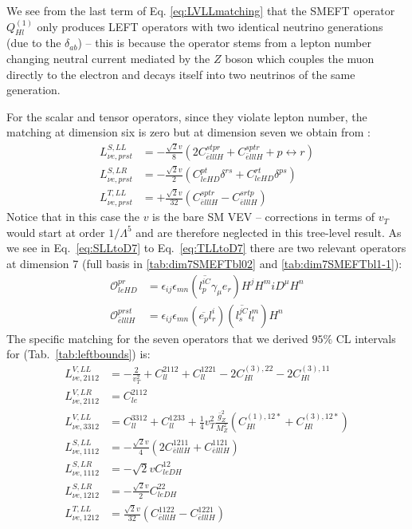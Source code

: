 We see from the last term of Eq. \ref{eq:LVLLmatching} that the SMEFT operator $Q_{Hl}^{(1)}$ only produces LEFT operators with two identical neutrino generations (due to the $\delta_{ab}$) -- this is because the operator stems from a lepton number changing neutral current mediated by the $Z$ boson which couples the muon directly to the electron and decays itself into two neutrinos of the same generation.\par  
For the scalar and tensor operators, since they violate lepton number, the matching at dimension six is zero but at dimension seven we obtain from \parencite{liao2020extending}:
\begin{align}
L^{S,LL}_{\nu e,prst} &= -\frac{\sqrt{2}v}{8} \left( 2C_{\bar{e}lllH}^{stpr} + C_{\bar{e}lllH}^{sptr} + p \leftrightarrow r \right) \label{eq:SLLtoD7}\\
L^{S,LR}_{\nu e,prst} &= -\frac{\sqrt{2}v}{2} \left( C_{leHD}^{pt}\delta^{rs} + C_{leHD}^{rt}\delta^{ps} \right) \label{eq:SLRtoD7} \\
L^{T,LL}_{\nu e, prst} &= +\frac{\sqrt{2}v}{32} \left( C_{\bar{e}lllH}^{sptr} - C_{\bar{e}lllH}^{srtp} \right) \label{eq:TLLtoD7}
\end{align}
Notice that in this case the $v$ is the bare SM VEV -- corrections in terms of $v_T$ would start at order $1/\Lambda^5$ and are therefore neglected in this tree-level result. As we see in Eq.~\ref{eq:SLLtoD7} to Eq.~\ref{eq:TLLtoD7} there are two relevant operators at dimension 7 (full basis in \ref{tab:dim7SMEFTbl02} and \ref{tab:dim7SMEFTbl1-1}):
\begin{align}
    \mathcal{O}_{leHD}^{pr} &= \epsilon_{ij}\epsilon_{mn} (\overline{l_p^{iC}} \gamma_\mu e_r) H^j H^m iD^\mu H^n \label{eq:leHD}\\
    \mathcal{O}_{\bar{e}lllH}^{prst} &= \epsilon_{ij}\epsilon_{mn} (\overline{e_p} l_r^i) (\overline{l_s^{jC}} l_t^m) H^n \label{eq:elllH}
\end{align}
The specific matching for the seven operators that we derived $95\%$ CL intervals for (Tab.~\ref{tab:leftbounds}) is:
\begin{align}
        L^{V,LL}_{\nu e,2112} &=-\frac{2}{v_T^2} + C_{ll}^{2112} + C_{ll}^{1221}-2C^{(3),22}_{Hl}-2C^{(3),11}_{Hl}\label{eq:specMatchVLL2112}\\
        L^{V,LR}_{\nu e,2112} &= C_{le}^{2112}\label{eq:specMatchVLR2112}\\
        L^{V,LL}_{\nu e,3312} &= C_{ll}^{3312}+C_{ll}^{1233}+\frac{1}{4}v_T^2\tfrac{\bar g_Z^2}{M_Z^2}\left(C_{Hl}^{(1),12*}+C_{Hl}^{(3),12*}\right)\\
        L^{S,LL}_{\nu e,1112} &= -\frac{\sqrt{2}v}{4}\left(2C_{\bar elllH}^{1211}+C_{\bar e lllH}^{1121}\right)\\
        L^{S,LR}_{\nu e,1112} &=-\sqrt{2}vC_{leDH}^{12}\\
        L^{S,LR}_{\nu e,1212} &=-\frac{\sqrt{2}v}{2}C_{leDH}^{22}\\
        L^{T,LL}_{\nu e,1212} &=\frac{\sqrt{2}v}{32}\left(C_{\bar elllH}^{1122}-C_{\bar elllH}^{1221}\right)\label{eq:specMatchTLL1221}
\end{align}
